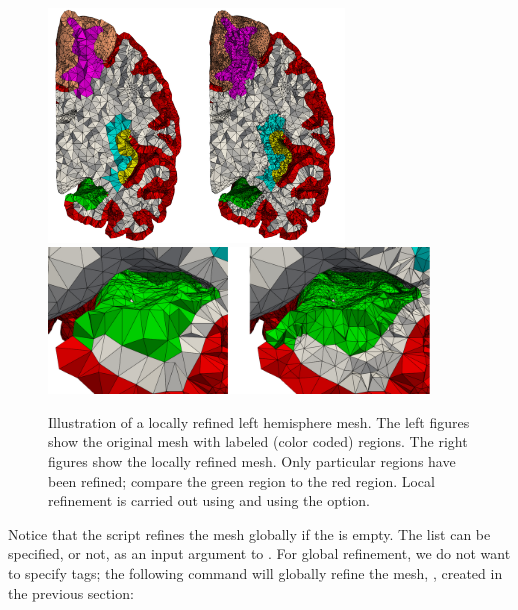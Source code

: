 \begin{figure}[t]	
  \begin{center}
    \includegraphics[width=0.7\textwidth]{./graphics/chp4/fenics-parcellation-crinkle.png} \\
    \includegraphics[width=0.9\textwidth]{./graphics/chp4/parcellations_refine_zoom.png}
  \end{center}
  \caption{Illustration of a locally refined left hemisphere mesh.  The left 
  figures show the original mesh with labeled (color coded) regions.  The 
  right figures show the locally refined mesh.  Only particular 
  regions have been refined; compare the green region to the red region.  Local 
  refinement is carried out using  and 
  using the  option.}
%
  \label{fig:chp4:fenics-parc}
\end{figure}
Notice that the script  refines the mesh 
globally if the  is empty.  The  list 
can be specified, or not, as an input argument to 
.  For global refinement, we do not want 
to specify tags; the following command will globally refine the mesh, 
, created in the previous section:

